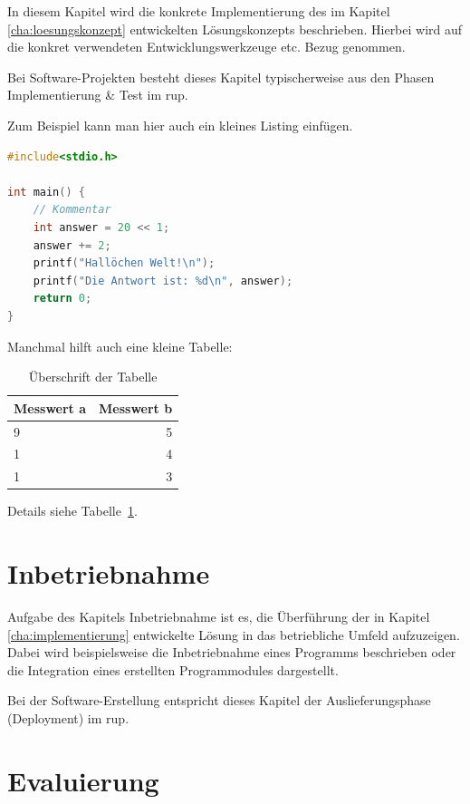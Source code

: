 \documentclass[oneside]{ausarbeitung}
\begin{document}
In diesem Kapitel wird die konkrete Implementierung des im Kapitel
\ref{cha:loesungskonzept} entwickelten Lösungskonzepts beschrieben.
Hierbei wird auf die konkret verwendeten Entwicklungswerkzeuge etc. 
Bezug genommen.

Bei Software-Projekten besteht dieses Kapitel typischerweise aus den 
Phasen Implementierung \& Test im \ac{rup}.

Zum Beispiel kann man hier auch ein kleines Listing einfügen.

\begin{lstlisting}[language=c,%
                   caption={Überschrift des Quelltexts}]
#include<stdio.h>

int main() {
    // Kommentar
    int answer = 20 << 1;
    answer += 2;
    printf("Hallöchen Welt!\n");
    printf("Die Antwort ist: %d\n", answer);
    return 0;
}
\end{lstlisting}

Manchmal hilft auch eine kleine Tabelle:

\begin{table}[htbp]
\centering
\begin{tabular}{|l|r|}
\hline
\textbf{Messwert a} & \textbf{Messwert b} \\ \hline
9 & 5 \\ \hline
1 & 4 \\ \hline
1 & 3 \\ \hline
\end{tabular}
\caption{Überschrift der Tabelle}
\label{tab:my-table}
\end{table}

Details siehe Tabelle~\ref{tab:my-table}.
\chapter{Inbetriebnahme}
\label{cha:inbetriebnahme}

Aufgabe des Kapitels Inbetriebnahme ist es, die Überführung der in 
Kapitel \ref{cha:implementierung} entwickelte Lösung in das betriebliche 
Umfeld aufzuzeigen. Dabei wird beispielsweise die Inbetriebnahme eines 
Programms beschrieben oder die Integration eines erstellten 
Programmodules dargestellt.

Bei der Software-Erstellung entspricht dieses Kapitel der 
Auslieferungsphase (Deployment) im \ac{rup}.

\chapter{Evaluierung}
\end{document}

